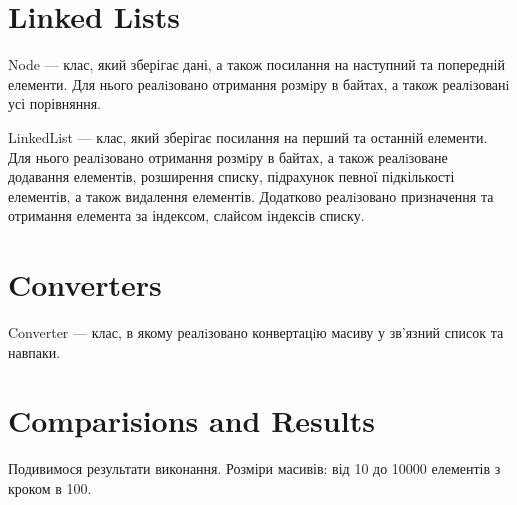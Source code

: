 \documentclass{article}
\begin{document}
\section{Linked Lists}  

    \indent Node --- клас, який зберігає дані, а також посилання на наступний та попередній елементи.
    Для нього реалiзовано отримання розмiру в байтах, а також реалiзованi усі порівняння.

    LinkedList --- клас, який зберігає посилання на перший та останній елементи.
    Для нього реалiзовано отримання розмiру в байтах, а також реалiзоване
    додавання елементів, розширення списку, підрахунок певної підкількості елементів, а також видалення елементів.
    \newline
    \indent Додатково реалiзовано призначення та отримання елемента за індексом, слайсом індексів списку.
\section{Converters}
Converter --- клас, в якому реалiзовано конвертацiю масиву у зв’язний список та навпаки.
\section{Comparisions and Results}
    Подивимося результати виконання. Розміри масивів: від 10 до 10000 елементів з кроком в 100.
    \newline
\end{document}
